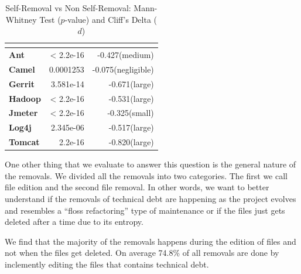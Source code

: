 \begin{table}[!tb]
	\begin{center}
		\caption{Self-Removal vs Non Self-Removal: Mann-Whitney Test ($p$-value) and Cliff's Delta ($d$)}
		\label{tbl:statistic}
		\begin{tabular}{l| rr}
			\toprule
			\textbf{\thead{Project}} & \textbf{\thead{$p$-value}} & \textbf{\thead{$d$}}\\ 
			\midrule
			\textbf{Ant   }   &  < 2.2e-16  &  -0.427(medium)  \\  
			\textbf{Camel }   &  0.0001253  &  -0.075(negligible)  \\  
			\textbf{Gerrit}   &  3.581e-14  &  -0.671(large)  \\  
			\textbf{Hadoop}   &  < 2.2e-16  &  -0.531(large)  \\  
			\textbf{Jmeter}   &  < 2.2e-16  &  -0.325(small)  \\  
			\textbf{Log4j }   &  2.345e-06  &  -0.517(large)  \\  
			\textbf{Tomcat}   &  2.2e-16    &  -0.820(large) \\  
			\bottomrule
		\end{tabular}
	\end{center}    
\end{table}






One other thing that we evaluate to answer this question is the general nature of the removals. We divided all the removals into two categories. The first we call file edition and the second file removal. In other words, we want to better understand if the removals of technical debt are happening as the project evolves and resembles a ``floss refactoring'' type of maintenance or if the files just gets deleted after a time due to its entropy. 

We find that the majority of the removals happens during the edition of files and not when the files get deleted. On average 74.8\% of all removals are done by inclemently editing the files that contains technical debt.




